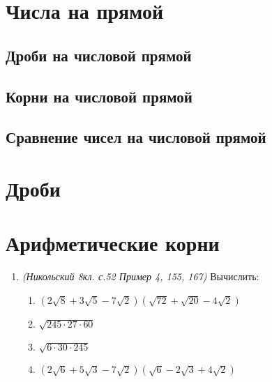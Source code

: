 \section{Числа на прямой}
\subsection{Дроби на числовой прямой}
	
\subsection{Корни на числовой прямой}
	
\subsection{Сравнение чисел на числовой прямой}
\section{Дроби}
\section{Арифметические корни}
\begin{enumerate}
	\item \textit{(Никольский 8кл. с.52 Пример 4, 155, 167)} Вычислить:
	\begin{enumerate}[label=\asbuk*)]
		\item $(2\sqrt{8}+3\sqrt{5}-7\sqrt{2})(\sqrt{72}+\sqrt{20}-4\sqrt{2})$
		\item  $\sqrt{245 \cdot 27 \cdot 60}$
		\item $\sqrt{6 \cdot 30 \cdot 245}$
		\item $(2\sqrt{6}+5\sqrt{3}-7\sqrt{2})(\sqrt{6}-2\sqrt{3}+4\sqrt{2})$
	\end{enumerate}
\end{enumerate}
